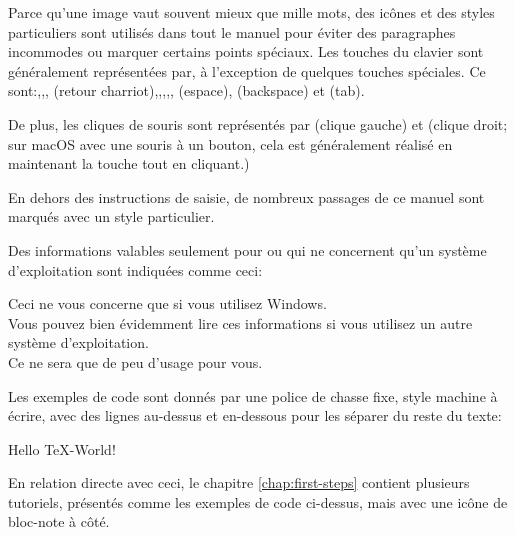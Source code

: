 Parce qu'une image vaut souvent mieux que mille mots, des icônes et des styles particuliers sont utilisés dans tout le manuel pour éviter des paragraphes incommodes ou marquer certains points spéciaux. Les touches du clavier sont généralement représentées par, à l'exception de quelques touches spéciales. Ce sont:,,, (retour charriot),,,,, (espace), (backspace) et  (tab).

De plus, les cliques de souris sont représentés par {\LMB} (clique gauche) et {\RMB} (clique droit; sur macOS avec une souris à un bouton, cela est généralement réalisé en maintenant la touche {\Ctrl} tout en cliquant.)

En dehors des instructions de saisie, de nombreux passages de ce manuel sont marqués avec un style particulier.

Des informations valables seulement pour ou qui ne concernent qu'un système d'exploitation sont indiquées comme ceci:
\begin{OSWindows}
\noindent Ceci ne vous concerne que si vous utilisez Windows. \\
Vous pouvez bien évidemment lire ces informations si vous utilisez un autre système d'exploitation. \\
Ce ne sera que de peu d'usage pour vous.
\end{OSWindows}

\bigskip
Les exemples de code sont donnés par une police de chasse fixe, style machine à écrire, avec des lignes au-dessus et en-dessous pour les séparer du reste du texte:
\begin{verbExample}
Hello \TeX-World!
\end{verbExample}

En relation directe avec ceci, le chapitre \ref{chap:first-steps} contient plusieurs tutoriels, présentés comme les exemples de code ci-dessus, mais avec une icône de bloc-note à côté.